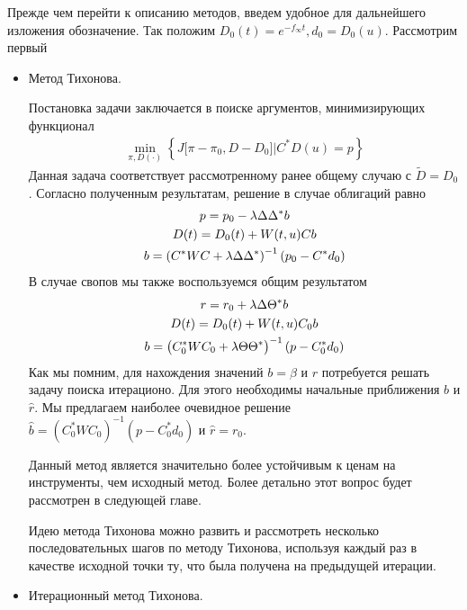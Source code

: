 \documentclass[10pt]{article}
\theoremstyle{definition}
\theoremstyle{remark}
\theoremstyle{plain}
\newcommand{\wt}{\widetilde}
\newcommand{\w}{f_\infty}
\begin{document}
 Прежде чем перейти к описанию методов, введем удобное для дальнейшего изложения обозначение. Так положим $D_0(t) = e^{-\w t}, d_0 = D_0(u)$. Рассмотрим первый
\begin{itemize}
\item Метод Тихонова. 

Постановка задачи заключается в поиске аргументов, минимизирующих функционал
\begin{align}
\min\limits_{\pi,D(\cdot)}
\left\{
	J\bigl[\pi-\pi_0,D - D_0\bigr]
	\Big|
	C^*D(u) = p 
\right\} \label{reg_Tikh_gen}
\end{align}
Данная задача соответствует рассмотренному ранее общему случаю с $\wt{D} = D_0$. Согласно полученным результатам, решение в случае облигаций равно
\begin{gather}
p = p_0 - \lambda\Delta\Delta^*b \notag
\\
D(t) = D_0(t) + W(t,u)Cb \notag
\\
b = \left(C^*WC+\lambda\Delta\Delta^*\right)^{-1}\left(p_0 - C^*d_0\right) \label{b_bond_Tikh}
\end{gather}
В случае свопов мы также воспользуемся общим результатом
\begin{gather}
r = r_0 + \lambda\Delta\Theta^*b \notag
\\
D(t) = D_0(t) + W(t,u)C_0b \notag
\\
b = \bigl(C_0^*WC_0+\lambda\Theta\Theta^*\bigr)^{-1}\left(p - C_0^*d_0\right) \label{b_swap_Tikh}
\end{gather}
Как мы помним, для нахождения значений $b = \beta$ и  $r$ потребуется решать задачу поиска итерационо. Для этого необходимы начальные приближения $\hat{b}$ и $\hat{r}$. Мы предлагаем наиболее очевидное решение $\hat{b} = (C_0^*WC_0)^{-1}(p-C_0^*d_0)$ и  $\hat{r} = r_0$.

Данный метод является значительно более устойчивым к ценам на инструменты, чем исходный метод. Более детально этот вопрос будет рассмотрен в следующей главе. 

Идею метода Тихонова можно развить и рассмотреть несколько последовательных шагов по методу Тихонова, используя каждый раз в качестве исходной точки ту, что была получена на предыдущей итерации.

\item 
Итерационный метод Тихонова. 


\end{itemize}
\end{document}
